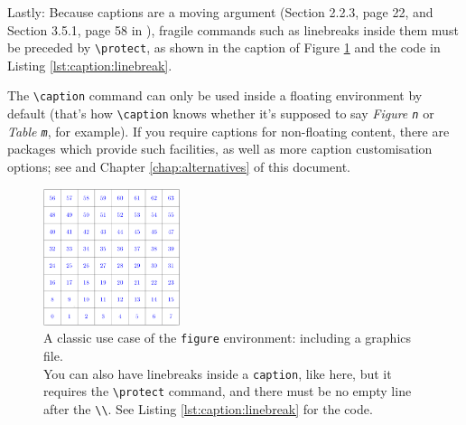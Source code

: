 \documentclass[article,a4paper,oneside,10pt]{memoir}
\newcommand\code[1]{\texttt{#1}}
\begin{document}
Lastly: Because captions  are a moving  argument (Section 2.2.3, page  22, and
Section 3.5.1, page 58 in \cite{lamport}), fragile commands such as linebreaks
inside them  must be preceded by  \verb|\protect|, as shown in  the caption of
Figure \ref{fig:protect} and the code in Listing \ref{lst:caption:linebreak}.

The \verb|\caption|  command can  only be used  inside a  floating environment
by  default  (that's  how  \verb|\caption|  knows  whether  it's  supposed  to
say  \emph{Figure  \code{n}}  or  \emph{Table  \code{m}},  for  example).   If
you   require  captions   for   non-floating  content,   there  are   packages
which  provide  such  facilities,  as   well  as  more  caption  customisation
options;   see   \cite{ctan:package:caption,ctan:topic:caption}  and   Chapter
\ref{chap:alternatives} of this document.


\begin{figure}
    \centering
    \includegraphics[height=4cm,width=4cm]{images/grid8cm.png}
    \caption[Linebreaks in Captions]{%
        A  classic use  case  of the  \code{figure}  environment: including  a
        graphics file.\protect\\
        You can also  have linebreaks inside a \code{caption},  like here, but
        it requires the \code{\textbackslash{}protect} command, and there must
        be  no empty  line after  the \code{\textbackslash\textbackslash}. See
        Listing \ref{lst:caption:linebreak} for the code.}
    \label{fig:protect}
\end{figure}
\end{document}
